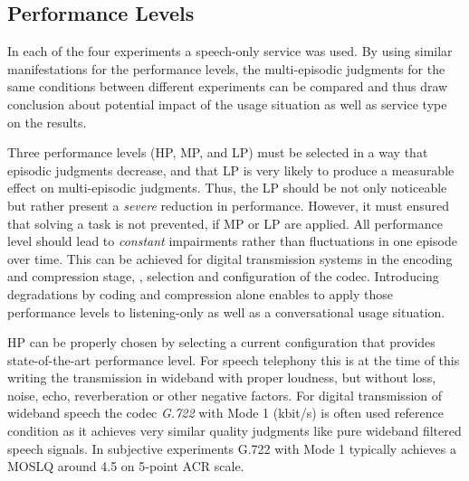 
\subsection{Performance Levels}
In each of the four experiments a speech-only service was used.
By using similar manifestations for the performance levels, the multi-episodic judgments for the same conditions between different experiments can be compared and thus draw conclusion about potential impact of the usage situation as well as service type on the results.

Three performance levels (\ac{HP}, \ac{MP}, and \ac{LP}) must be selected in a way that episodic judgments decrease, and that \ac{LP} is very likely to produce a measurable effect on multi-episodic judgments.
Thus, the \ac{LP} should be not only noticeable but rather present a \emph{severe} reduction in performance. 
However, it must ensured that solving a task is not prevented, if \ac{MP} or \ac{LP} are applied.
All performance level should lead to \emph{constant} impairments rather than fluctuations in one episode over time.
This can be achieved for digital transmission systems in the encoding and compression stage, \eg, selection and configuration of the codec.
Introducing degradations by coding and compression alone enables to apply those performance levels to listening-only as well as a conversational usage situation.

\ac{HP} can be properly chosen by selecting a current configuration that provides state-of-the-art performance level.
For speech telephony this is at the time of this writing the transmission in wideband with proper loudness, but without loss, noise, echo, reverberation or other negative factors.
For digital transmission of wideband speech the codec \emph{G.722} with Mode 1 (\unit[64]{kbit/s}) is often used reference condition as it achieves very similar quality judgments like pure wideband filtered speech signals. %
In subjective experiments G.722 with Mode 1 typically achieves a \ac{MOSLQ} around 4.5 on 5-point \ac{ACR} scale.

